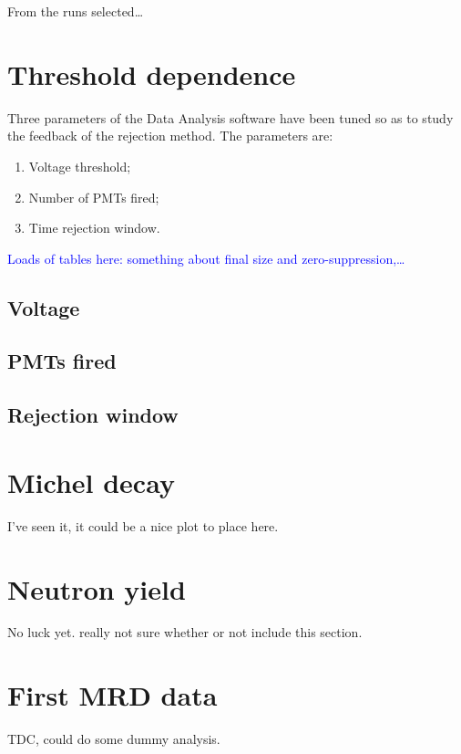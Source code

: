  From the runs selected\ldots


\section{Threshold dependence}

Three parameters of the Data Analysis software have been tuned so as to study the feedback %
of the rejection method.
The parameters are:
\begin{enumerate}
  \item Voltage threshold;
  \item Number of PMTs fired;
  \item Time rejection window.
\end{enumerate}

\textcolor{blue}{Loads of tables here: something about final size and zero-suppression,\ldots}
\subsection{Voltage}
\subsection{PMTs fired}
\subsection{Rejection window}

\section{Michel decay}
I've seen it, it could be a nice plot to place here. 

\section{Neutron yield}
No luck yet.
really not sure whether or not include this section.

\section{First MRD data}
TDC, could do some dummy analysis.

